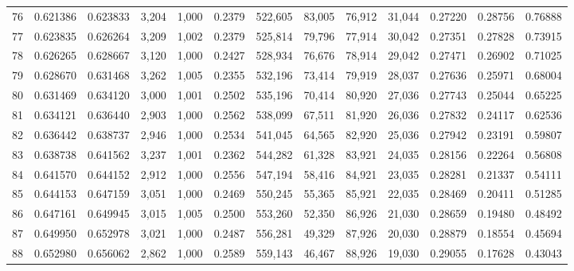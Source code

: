 \begin{tabular}{rrrrrrrrrrrrr}
76  &  0.621386 &  0.623833 &   3,204 &  1,000 &                                     0.2379 &  522,605 &   83,005 &   76,912 &   31,044 &  0.27220 &  0.28756 &  0.76888 \\
77  &  0.623835 &  0.626264 &   3,209 &  1,002 &                                     0.2379 &  525,814 &   79,796 &   77,914 &   30,042 &  0.27351 &  0.27828 &  0.73915 \\
78  &  0.626265 &  0.628667 &   3,120 &  1,000 &                                     0.2427 &  528,934 &   76,676 &   78,914 &   29,042 &  0.27471 &  0.26902 &  0.71025 \\
79  &  0.628670 &  0.631468 &   3,262 &  1,005 &                                     0.2355 &  532,196 &   73,414 &   79,919 &   28,037 &  0.27636 &  0.25971 &  0.68004 \\
80  &  0.631469 &  0.634120 &   3,000 &  1,001 &                                     0.2502 &  535,196 &   70,414 &   80,920 &   27,036 &  0.27743 &  0.25044 &  0.65225 \\
81  &  0.634121 &  0.636440 &   2,903 &  1,000 &                                     0.2562 &  538,099 &   67,511 &   81,920 &   26,036 &  0.27832 &  0.24117 &  0.62536 \\
82  &  0.636442 &  0.638737 &   2,946 &  1,000 &                                     0.2534 &  541,045 &   64,565 &   82,920 &   25,036 &  0.27942 &  0.23191 &  0.59807 \\
83  &  0.638738 &  0.641562 &   3,237 &  1,001 &                                     0.2362 &  544,282 &   61,328 &   83,921 &   24,035 &  0.28156 &  0.22264 &  0.56808 \\
84  &  0.641570 &  0.644152 &   2,912 &  1,000 &                                     0.2556 &  547,194 &   58,416 &   84,921 &   23,035 &  0.28281 &  0.21337 &  0.54111 \\
85  &  0.644153 &  0.647159 &   3,051 &  1,000 &                                     0.2469 &  550,245 &   55,365 &   85,921 &   22,035 &  0.28469 &  0.20411 &  0.51285 \\
86  &  0.647161 &  0.649945 &   3,015 &  1,005 &                                     0.2500 &  553,260 &   52,350 &   86,926 &   21,030 &  0.28659 &  0.19480 &  0.48492 \\
87  &  0.649950 &  0.652978 &   3,021 &  1,000 &                                     0.2487 &  556,281 &   49,329 &   87,926 &   20,030 &  0.28879 &  0.18554 &  0.45694 \\
88  &  0.652980 &  0.656062 &   2,862 &  1,000 &                                     0.2589 &  559,143 &   46,467 &   88,926 &   19,030 &  0.29055 &  0.17628 &  0.43043 \\

\end{tabular}
